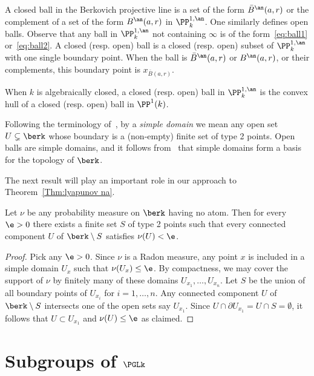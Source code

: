 A closed ball in the Berkovich projective line is a set of the form $\bar B^\an(a, r)$ or the complement of a set of the form $B^\an(a, r) $ in $\PP^{1, \an}_k$. One similarly defines open balls. Observe that any ball in $\PP^{1, \an}_k$ not containing $\infty$ is of the form~\eqref{eq:ball1} or~\eqref{eq:ball2}. A closed (resp. open) ball is a closed (resp. open) subset of $\PP^{1, \an}_k$ with one single boundary point. When the ball is $\bar B^\an(a, r) $ or $B^\an(a, r)$, or their complements, this boundary point is $x_{\bar{B}(a,r)}$.

When $k$ is algebraically closed, a closed (resp. open) ball in $\PP^{1, \an}_k$ is the convex hull of a closed (resp. open) ball in $\PP^1(k)$.


Following the terminology of~\cite{baker-rumely}, by a \emph{simple domain} we mean any open set $U\subsetneq \berk$ whose boundary is a (non-empty) finite set of type 2 points. Open balls are simple domains, and it follows from~\cite[Thm.~4.2.1]{berko} that simple domains form a basis for the topology of $\berk$.

The next result will play an important role in our approach to Theorem~\ref{Thm:lyapunov na}.

\begin{prop}\label{prop:subtree Hk}
Let $\nu$ be any probability measure on $\berk$ having no atom. Then for every $\e>0$ there exists a finite set $S$ of type 2 points such that every connected component $U$ of $\berk\setminus S$ satisfies $\nu(U)<\e$.
\end{prop}

\begin{proof}
Pick any $\e>0$. Since $\nu$ is a Radon measure, any point $x$ is included in a simple domain $U_x$ such that $\nu(U_x) \le \e$. By compactness, we may cover the support of $\nu$ by finitely many of these domains $U_{x_1}, \ldots, U_{x_n}$. Let $S$ be the union of all boundary points of $U_{x_i}$ for $i =1, \ldots,n$. Any connected component $U$ of $\berk\setminus S$ intersects one of the open sets say $U_{x_1}$. Since $U \cap \partial U_{x_1} = U\cap S = \emptyset$, it follows that $U\subset U_{x_1}$ and $\nu(U) \le \e$ as claimed.
\end{proof}


\section{Subgroups of \texorpdfstring{$\PGLk$}{PGLk}}\label{sec:subgroups}

